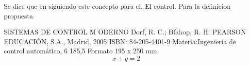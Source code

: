\documentclass[11pt,a4paper]{book}
\begin{document}
 Se dice que  en \cite{khalil:2002} siguiendo 
 este concepto para el. El control. Para la definicion 
 propuesta
 
 SISTEMAS DE CONTROL M ODERNO Dorf, R. C.; Bfahop, R. H. PEARSON EDUCACIÓN, S.A., Madrid, 2005 ISBN: 
 84-205-4401-9 Materia:Ingeniería de control automático, 6 185,5 Formato 195 x 250 mm
\begin{equation}
    x+y=2
\end{equation}


\end{document}
